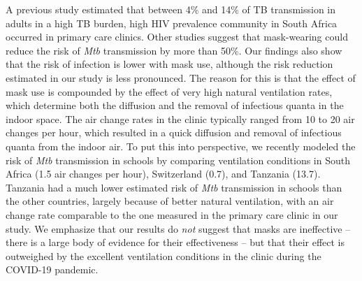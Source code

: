 \documentclass[fleqn,11pt]{wlscirep}
\begin{document}
A previous study estimated that between 4\% and 14\% of TB transmission in adults in a high TB burden, high HIV prevalence community in South Africa occurred in primary care clinics\cite{McCreesh2022BMJGlobalHealth}. Other studies suggest that mask-wearing could reduce the risk of \emph{Mtb} transmission by more than 50\%\cite{Dharmadhikari2012AJRCCM,McCreesh2021BMJGlobalHealth}. Our findings also show that the risk of infection is lower with mask use, although the risk reduction estimated in our study is less pronounced. The reason for this is that the effect of mask use is compounded by the effect of very high natural ventilation rates, which determine both the diffusion and the removal of infectious quanta in the indoor space. The air change rates in the clinic typically ranged from 10 to 20 air changes per hour, which resulted in a quick diffusion and removal of infectious quanta from the indoor air. To put this into perspective, we recently modeled the risk of \emph{Mtb} transmission in schools by comparing ventilation conditions in South Africa (1.5 air changes per hour), Switzerland (0.7), and Tanzania (13.7)\cite{Banholzer2024PGPH}. Tanzania had a much lower estimated risk of \emph{Mtb} transmission in schools than the other countries, largely because of better natural ventilation, with an air change rate comparable to the one measured in the primary care clinic in our study. We emphasize that our results do \emph{not} suggest that masks are ineffective -- there is a large body of evidence for their effectiveness -- but that their effect is outweighed by the excellent ventilation conditions in the clinic during the COVID-19 pandemic.

\end{document}
